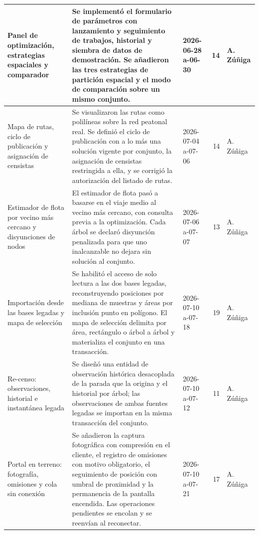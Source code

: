 \begin{xltabular}{\linewidth}{|p{3cm}|X|p{3cm}|r|l|}
\hline
Panel de optimización, estrategias espaciales y comparador & Se implementó el formulario de parámetros con lanzamiento y seguimiento de trabajos, historial y siembra de datos de demostración. Se añadieron las tres estrategias de partición espacial y el modo de comparación sobre un mismo conjunto. & 2026-06-28 a-06-30 & 14 & A. Zúñiga \\
\hline
Mapa de rutas, ciclo de publicación y asignación de censistas & Se visualizaron las rutas como polilíneas sobre la red peatonal real. Se definió el ciclo de publicación con a lo más una solución vigente por conjunto, la asignación de censistas restringida a ella, y se corrigió la autorización del listado de rutas. & 2026-07-04 a-07-06 & 14 & A. Zúñiga \\
\hline
Estimador de flota por vecino más cercano y disyunciones de nodos & El estimador de flota pasó a basarse en el viaje medio al vecino más cercano, con consulta previa a la optimización. Cada árbol se declaró disyunción penalizada para que uno inalcanzable no dejara sin solución al conjunto. & 2026-07-06 a-07-07 & 13 & A. Zúñiga \\
\hline
Importación desde las bases legadas y mapa de selección & Se habilitó el acceso de solo lectura a las dos bases legadas, reconstruyendo posiciones por mediana de muestras y áreas por inclusión punto en polígono. El mapa de selección delimita por área, rectángulo o árbol a árbol y materializa el conjunto en una transacción. & 2026-07-10 a-07-18 & 19 & A. Zúñiga \\
\hline
Re-censo: observaciones, historial e instantánea legada & Se diseñó una entidad de observación histórica desacoplada de la parada que la origina y el historial por árbol; las observaciones de ambas fuentes legadas se importan en la misma transacción del conjunto. & 2026-07-10 a-07-12 & 11 & A. Zúñiga \\
\hline
Portal en terreno: fotografía, omisiones y cola sin conexión & Se añadieron la captura fotográfica con compresión en el cliente, el registro de omisiones con motivo obligatorio, el seguimiento de posición con umbral de proximidad y la permanencia de la pantalla encendida. Las operaciones pendientes se encolan y se reenvían al reconectar. & 2026-07-10 a-07-21 & 17 & A. Zúñiga \\

\end{xltabular}
